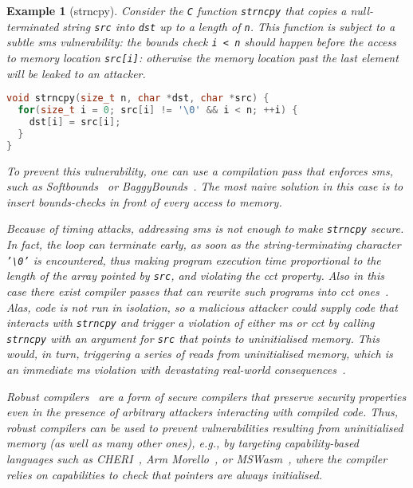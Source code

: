 \documentclass[dvipsnames]{llncs}
\newtheorem{exampleenv}{Example}[section]
\begin{document}
\begin{exampleenv}[strncpy]\label{ex:strncpy}
Consider the \texttt{C} function \texttt{strncpy} that copies a null-terminated string \texttt{src} into \texttt{dst} up to a length of \texttt{n}.
This function is subject to a subtle \gls*{sms} vulnerability: the bounds check \texttt{i < n} should happen {\it before} the access to memory location \texttt{src[i]}: otherwise
the memory location past the last element will be leaked to an attacker.
\begin{lstlisting}[language=c,basicstyle=\footnotesize\ttfamily,morekeywords={size_t}]
void strncpy(size_t n, char *dst, char *src) {
  for(size_t i = 0; src[i] != '\0' && i < n; ++i) {
    dst[i] = src[i];
  }
}
\end{lstlisting}

To prevent this vulnerability, one can use a compilation pass that enforces \gls*{sms}, such as Softbounds~\cite{nagarakatte2009soft} or BaggyBounds~\cite{akritidis2009baggy}.
The most naive solution in this case is to insert bounds-checks in front of every access to memory.

Because of timing attacks, addressing \gls*{sms} is not enough to make \texttt{strncpy} secure.
In fact, the loop can terminate early, as soon as the string-terminating character \texttt{'\textbackslash 0'} is encountered, thus making program execution time proportional to the length of the array pointed by \texttt{src}, and violating the \gls*{cct} property.
Also in this case there exist compiler passes that can rewrite such programs into \gls*{cct} ones~\cite{cauligi2019fact}.
%
Alas, code is not run in isolation, so a malicious attacker could supply code that interacts with \texttt{strncpy} and trigger a violation of either \gls*{ms} or \gls*{cct} by calling \texttt{strncpy} with an argument for \texttt{src} that points to uninitialised memory.
This would, in turn, triggering a series of reads from uninitialised memory, which is an immediate \gls*{ms} violation with devastating real-world consequences~\cite{uninit-0,uninit-1,uninit-2,uninit-3,uninit-4}.

Robust compilers~\cite{abate2019jour} are a form of secure compilers that preserve security properties even in the presence of arbitrary attackers interacting with compiled code.
Thus, robust compilers can be used to prevent vulnerabilities resulting from uninitialised memory (as well as many other ones), e.g., by targeting capability-based languages such as CHERI~\cite{woodruff2014CHERI}, Arm Morello~\cite{arm-morello}, or MSWasm~\cite{michael2023mswasm}, where the compiler relies on capabilities to check that pointers are always initialised.
\end{exampleenv}
\end{document}
